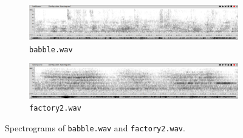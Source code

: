 \documentclass[11pt,a4paper,titlepage]{article}
\begin{document}
\begin{figure}[htbp]
  \centering
  \begin{subfigure}{0.7\textwidth}
    \includegraphics[width=\textwidth]{babble-spectrogram}
    \caption{\texttt{babble.wav}}
    \label{fig:babble-spectrogram}
  \end{subfigure}

  \begin{subfigure}{0.7\textwidth}
    \includegraphics[width=\textwidth]{factory2-spectrogram}
    \caption{\texttt{factory2.wav}}
    \label{fig:factory2-spectrogram}
  \end{subfigure}

  \caption{Spectrograms of \texttt{babble.wav} and \texttt{factory2.wav}.} \label{fig:noise-spectrogram}
\end{figure}
\end{document}
